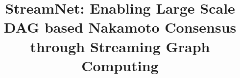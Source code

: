 \documentclass[sigconf, review, anonymous]{acmart}
\begin{document}
\title{StreamNet: Enabling Large Scale DAG based Nakamoto Consensus through Streaming Graph Computing}


\maketitle

%










\end{document}
